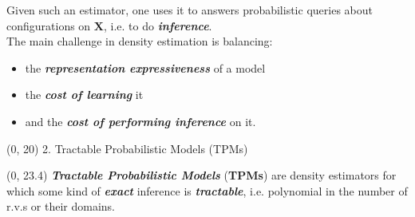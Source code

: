 \documentclass[final]{beamer}
\begin{document}
\begin{frame}{}
\begin{textblock}{17.5}
    Given such an estimator, one uses it to answers
    probabilistic queries about configurations on $\mathbf{X}$,
    i.e. to do \emph{\textbf{inference}}.\\[20pt]

    The main challenge in density estimation is balancing:
    \begin{itemize}
    \item the \textbf{\emph{representation expressiveness}} of a model
    \item the \textbf{\emph{cost of learning}} it
      \item and the \textbf{\emph{cost of performing inference}} on it.
    \end{itemize}
    

    
    

  \end{textblock}

  \begin{textblock}{17.5}(0, 20)
    2. Tractable Probabilistic Models (TPMs)
  \end{textblock}
  
  \begin{textblock}{17.5}(0, 23.4)
    \small
    \emph{\textbf{Tractable Probabilistic Models} }  (\textbf{TPMs})
    are density estimators for which some kind of  \textbf{\emph{exact}} inference is
    \textbf{\emph{tractable}}, i.e. polynomial in the number of r.v.s or their
    domains.\\[20pt]


\end{textblock}
\end{frame}
\end{document}
